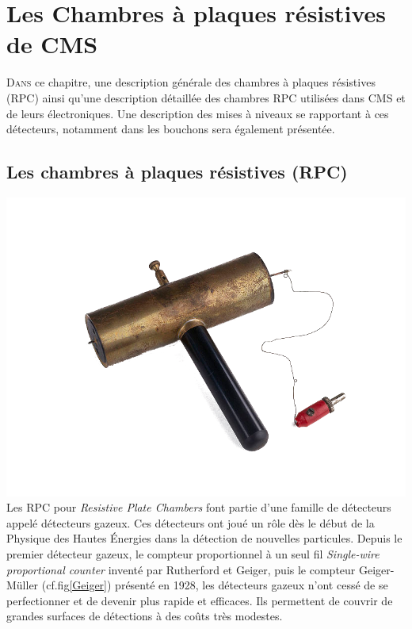 \chapter{Les Chambres à plaques résistives de CMS}
\renewcommand\chapterillustration{RPC/rpc}
\ThisULCornerWallPaper{1}{\chapterillustration}
\minitoc

\lettrine[lines=4, slope=-0.5em]{D}{ans} ce chapitre, une description générale des chambres à plaques résistives (RPC) ainsi qu'une description détaillée des chambres RPC utilisées dans CMS et de leurs électroniques. Une description des mises à niveaux se rapportant à ces détecteurs, notamment dans les bouchons sera également présentée.

\section{Les chambres à plaques résistives (RPC)}

 \marginpar
{
	\centering
	\includegraphics[width=\marginparwidth]{RPC/Geiger.png}
	\label{Geiger}
}
Les RPC pour \textit{Resistive Plate Chambers} font partie d'une famille de détecteurs appelé détecteurs gazeux. Ces détecteurs ont joué un rôle dès le début de la Physique des Hautes Énergies dans la détection de nouvelles particules. Depuis le premier détecteur gazeux, le compteur proportionnel à un seul fil \textit{Single-wire proportional counter} inventé par Rutherford et Geiger, puis le compteur Geiger-Müller (cf.fig\ref{Geiger}) présenté en 1928, les détecteurs gazeux n'ont cessé de se perfectionner et de devenir plus rapide et efficaces. Ils permettent de couvrir de grandes surfaces de détections à des coûts très modestes.

